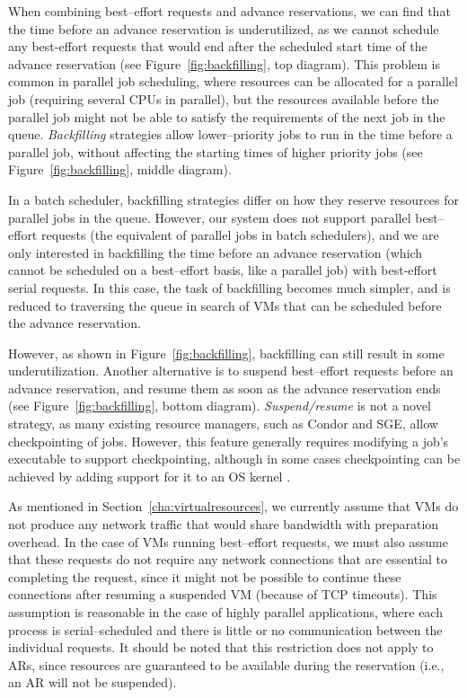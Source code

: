 When combining best--effort requests and advance reservations, we can find that the time before an advance reservation is underutilized, as we cannot schedule any best-effort requests that would end after the scheduled start time of the advance reservation (see Figure~\ref{fig:backfilling}, top diagram). This problem is common in parallel job scheduling, where resources can be allocated for a parallel job (requiring several CPUs in parallel), but the resources available before the parallel job might not be able to satisfy the requirements of the next job in the queue. \emph{Backfilling} strategies \cite{10.1109/ICPPW.2002.1039773,feitelson02analyzing,feitelson04parallel} allow lower--priority jobs to run in the time before a parallel job, without affecting the starting times of higher priority jobs (see Figure~\ref{fig:backfilling}, middle diagram).

In a batch scheduler, backfilling strategies differ on how they reserve resources for parallel jobs in the queue. However, our system does not support parallel best--effort requests (the equivalent of parallel jobs in batch schedulers), and we are only interested in backfilling the time before an advance reservation (which cannot be scheduled on a best--effort basis, like a parallel job) with best-effort serial requests. In this case, the task of backfilling becomes much simpler, and is reduced to traversing the queue in search of VMs that can be scheduled before the advance reservation.

However, as shown in Figure~\ref{fig:backfilling}, backfilling can still result in some underutilization. Another alternative is to suspend best--effort requests before an advance reservation, and resume them as soon as the advance reservation ends (see Figure~\ref{fig:backfilling}, bottom diagram). \emph{Suspend/resume} is not a novel strategy, as many existing resource managers, such as Condor and SGE, allow checkpointing of jobs. However, this feature generally requires modifying a job's executable to support checkpointing, although in some cases checkpointing can be achieved by adding support for it to an OS kernel \cite{blcr}. 

As mentioned in Section~\ref{cha:virtualresources}, we currently assume that VMs do not produce any network traffic that would share bandwidth with preparation overhead. In the case of VMs running best--effort requests, we must also assume that these requests do not require any network connections that are essential to completing the request, since it might not be possible to continue these connections after resuming a suspended VM (because of TCP timeouts). This assumption is reasonable in the case of highly parallel applications, where each process is serial--scheduled and there is little or no communication between the individual requests. It should be noted that this restriction does not apply to ARs, since resources are guaranteed to be available during the reservation (i.e., an AR will not be suspended).



